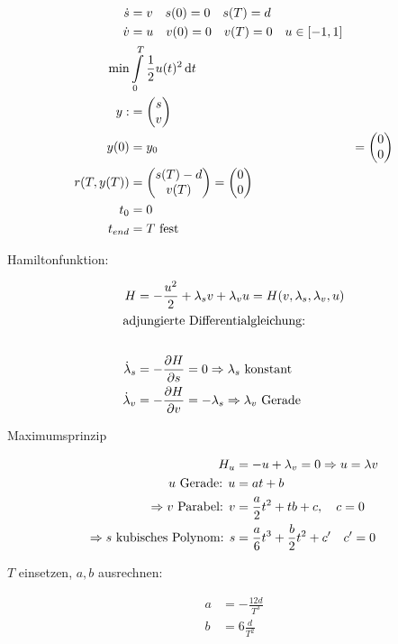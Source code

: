 
\begin{align*}
\dot s &= v \quad s(0) = 0 \quad s(T) = d \\
\dot v &= u \quad v(0) = 0 \quad v(T) = 0 \quad u \in [-1,1]\\
\min & \int\limits_0^T \frac 12 u(t)^2 \,\mathrm d t \\
y :&= \begin{pmatrix} s \\ v \end{pmatrix} \\
y(0) &= y_0 &= \begin{pmatrix} 0 \\ 0 \end{pmatrix} \\
r(T, y(T)) &= \begin{pmatrix} s(T)-d \\ v(T) \end{pmatrix} = \begin{pmatrix} 0 \\ 0 \end{pmatrix} \\
t_0 &= 0 \\
{t_{end}} &= T \text{ fest} \\
\end{align*}

Hamiltonfunktion: 

\begin{align*}
H &= - \frac{u^2}{2} + \lambda_s v + \lambda_v u = H(v, \lambda_s, \lambda_v, u)  \\
\intertext{adjungierte Differentialgleichung:} \\
\dot \lambda_s &= - \frac{\partial H}{\partial s} = 0 \Rightarrow \lambda_s \text{ konstant} \\
\dot \lambda_v &= -\frac{\partial H}{\partial v} = - \lambda_s \Rightarrow \lambda_v \text{ Gerade} \\
\end{align*}

Maximumsprinzip

\begin{align*}
H_u &= - u + \lambda_v = 0 \Rightarrow u = \lambda v \\
u \text{ Gerade: } u &= at+b \\
\Rightarrow v \text{ Parabel: } v &= \frac a2 t^2 + tb + c, \quad c = 0 \\
\Rightarrow s \text{ kubisches Polynom: } s &= \frac a6 t^3 + \frac b2 t^2 + c' \quad c' = 0 \\
\end{align*}

$T$ einsetzen, $a,b$ ausrechnen:

\begin{align*}
a &= - \frac{12 d}{T^3} \\
b &= 6 \frac d{T^2} \\
\end{align*}

